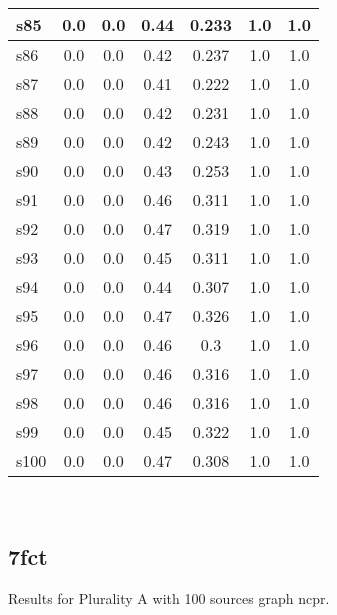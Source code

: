 \documentclass{article}
\begin{document}
\begin{tabular}{|l|c|c|c|c|c|c|}
\hline
s85 &0.0 & 0.0 & 0.44 & 0.233 & 1.0 & 1.0\\
\hline
s86 &0.0 & 0.0 & 0.42 & 0.237 & 1.0 & 1.0\\
\hline
s87 &0.0 & 0.0 & 0.41 & 0.222 & 1.0 & 1.0\\
\hline
s88 &0.0 & 0.0 & 0.42 & 0.231 & 1.0 & 1.0\\
\hline
s89 &0.0 & 0.0 & 0.42 & 0.243 & 1.0 & 1.0\\
\hline
s90 &0.0 & 0.0 & 0.43 & 0.253 & 1.0 & 1.0\\
\hline
s91 &0.0 & 0.0 & 0.46 & 0.311 & 1.0 & 1.0\\
\hline
s92 &0.0 & 0.0 & 0.47 & 0.319 & 1.0 & 1.0\\
\hline
s93 &0.0 & 0.0 & 0.45 & 0.311 & 1.0 & 1.0\\
\hline
s94 &0.0 & 0.0 & 0.44 & 0.307 & 1.0 & 1.0\\
\hline
s95 &0.0 & 0.0 & 0.47 & 0.326 & 1.0 & 1.0\\
\hline
s96 &0.0 & 0.0 & 0.46 & 0.3 & 1.0 & 1.0\\
\hline
s97 &0.0 & 0.0 & 0.46 & 0.316 & 1.0 & 1.0\\
\hline
s98 &0.0 & 0.0 & 0.46 & 0.316 & 1.0 & 1.0\\
\hline
s99 &0.0 & 0.0 & 0.45 & 0.322 & 1.0 & 1.0\\
\hline
s100 &0.0 & 0.0 & 0.47 & 0.308 & 1.0 & 1.0\\
\hline
\end{tabular}\\

\newpage

\subsection{7fct}

\noindent Results for Plurality A with 100 sources graph ncpr.
\end{document}
